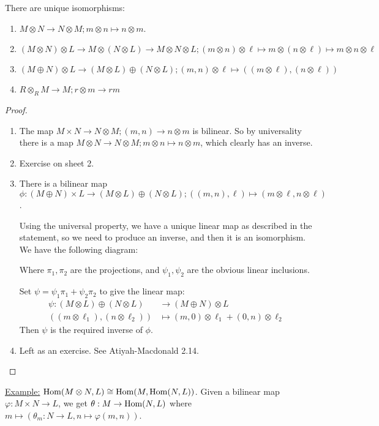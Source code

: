 \documentclass[10pt,a4paper]{article}
\begin{document}
\begin{lemma}
  There are unique isomorphisms:
  \begin{enumerate}
    \item $M \otimes N \to N\otimes M; m\otimes n \mapsto n \otimes m$.
    \item $(M\otimes N)\otimes L\to M\otimes(N\otimes L) \to M\otimes N\otimes L; (m\otimes n)\otimes \ell\mapsto m\otimes(n\otimes \ell) \mapsto m\otimes n\otimes \ell$
    \item $(M \oplus N)\otimes L \to (M \otimes L)\oplus(N\otimes L); (m,n)\otimes \ell \mapsto ((m\otimes \ell), (n\otimes \ell))$
    \item $R\otimes_R M \to M; r\otimes m \to rm$
  \end{enumerate}
\end{lemma}
\begin{proof}\hspace*{0cm}
  \begin{enumerate}[label=\textit{\arabic*.}]
    \item The map $M\times N \to N \otimes M; (m,n) \to n\otimes m$ is bilinear. So by universality there is a map $M \otimes N \to N \otimes M; m \otimes n \mapsto n \otimes m$, which clearly has an inverse.
    \item Exercise on sheet 2.
    \item There is a bilinear map $\phi:(M \oplus N)\times L \to (M\otimes L)\oplus (N \otimes L); ((m,n), \ell) \mapsto (m \otimes \ell, n\otimes \ell)$.

    Using the universal property, we have a unique linear map as described in the statement, so we need to produce an inverse, and then it is an isomorphism. We have the following diagram:
    \begin{center}
    \end{center}
    Where $\pi_1, \pi_2$ are the projections, and $\psi_1, \psi_2$ are the obvious linear inclusions.

    Set $\psi = \psi_1\pi_1 + \psi_2\pi_2$ to give the linear map:
    \begin{align*}
      \psi:(M \otimes L)\oplus (N \otimes L) &\to (M\oplus N)\otimes L\\
      ((m\otimes \ell_1), (n\otimes \ell_2)) &\mapsto (m,0)\otimes \ell_1 + (0,n)\otimes \ell_2
    \end{align*}
    Then $\psi$ is the required inverse of $\phi$.
    \item Left as an exercise. See Atiyah-Macdonald 2.14.
  \end{enumerate}
\end{proof}
\underline{Example:} $\operatorname{Hom}(M\otimes N, L) \cong \operatorname{Hom}(M, \operatorname{Hom}(N, L))$. Given a bilinear map $\varphi:M \times N \to L$, we get $\theta : M \to \operatorname{Hom}(N,L)$ where $m \mapsto (\theta_m:N \to L, n\mapsto \varphi(m,n))$.
\end{document}

